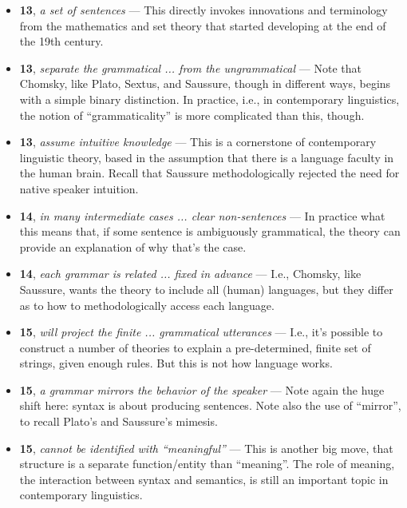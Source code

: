 \documentclass[12pt]{article}
\begin{document}
\begin{itemize}

\item \textbf{13}, \textit{a set of sentences} --- This directly invokes innovations and terminology from the mathematics and set theory that started developing at the end of the 19th century.

\item \textbf{13}, \textit{separate the grammatical ... from the ungrammatical} --- Note that Chomsky, like Plato, Sextus, and Saussure, though in different ways, begins with a simple binary distinction. In practice, i.e., in contemporary linguistics, the notion of ``grammaticality'' is more complicated than this, though.

\item \textbf{13}, \textit{assume intuitive knowledge} --- This is a cornerstone of contemporary linguistic theory, based in the assumption that there is a language faculty in the human brain. Recall that Saussure methodologically rejected the need for native speaker intuition.

\item \textbf{14}, \textit{in many intermediate cases ... clear non-sentences} --- In practice what this means that, if some sentence is ambiguously grammatical, the theory can provide an explanation of why that's the case.

\item \textbf{14}, \textit{each grammar is related ... fixed in advance} --- I.e., Chomsky, like Saussure, wants the theory to include all (human) languages, but they differ as to how to methodologically access each language.

\item \textbf{15}, \textit{will project the finite ... grammatical utterances} --- I.e., it's possible to construct a number of theories to explain a pre-determined, finite set of strings, given enough rules. But this is not how language works.

\item \textbf{15}, \textit{a grammar mirrors the behavior of the speaker} --- Note again the huge shift here: syntax is about producing sentences. Note also the use of ``mirror'', to recall Plato's and Saussure's mimesis.

\item \textbf{15}, \textit{cannot be identified with ``meaningful''} --- This is another big move, that structure is a separate function/entity than ``meaning''. The role of meaning, the interaction between syntax and semantics, is still an important topic in contemporary linguistics.


\end{itemize}
\end{document}
